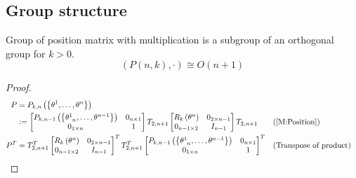 \documentclass[stu, babel, american, biblatex, a4paper, leqno, draftall]{apa7}
\begin{document}
\subsection{Group structure}
\begin{proposition}
    Group of position matrix with multiplication is a subgroup of an orthogonal group for $k>0$.
    \begin{equation*}
        \left(P\left(n, k\right),\cdot\right)\cong O\left(n+1\right)
    \end{equation*}
\end{proposition}
\begin{proof}
    \begin{align*}
        P&=P_{k,n}\left(\left\{\tensor{\theta}{^1},\dots,\tensor{\theta}{^n}\right\}\right) \\
        &\defeq
        \begin{bmatrix}
            P_{k,n-1}\left(\left\{\tensor{\theta}{^1_{n}},\dots,\tensor{\theta}{^{n-1}}\right\}\right) & 0_{n\times 1} \\
            0_{1\times n}                                                                              & 1             \\
        \end{bmatrix}
        T_{2,n+1}
        \begin{bmatrix}
            R_k\left(\tensor{\theta}{^n}\right) & 0_{{2}\times{n-1}} \\
            0_{{n-1}\times{2}}                  & {I}_{n-1}          \\
        \end{bmatrix}
        T_{2,n+1} && \text{(\cref{M:Position})} \\
        P^T
        &=
        T_{2,n+1}^T
        \begin{bmatrix}
            R_k\left(\tensor{\theta}{^n}\right) & 0_{{2}\times{n-1}} \\
            0_{{n-1}\times{2}}                  & {I}_{n-1}          \\
        \end{bmatrix}^T
        T_{2,n+1}^T
        \begin{bmatrix}
            P_{k,n-1}\left(\left\{\tensor{\theta}{^1_{n}},\dots,\tensor{\theta}{^{n-1}}\right\}\right) & 0_{n\times 1} \\
            0_{1\times n}                                                                              & 1             \\
        \end{bmatrix}^T && \text{(Transpose of product)} \\

\end{align*}
\end{proof}
\end{document}
